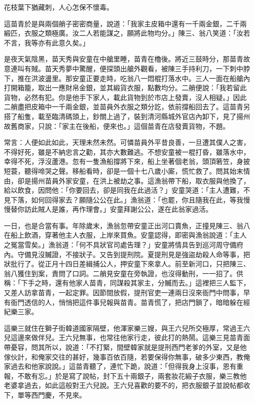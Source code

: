 花枝葉下猶藏刺，人心怎保不懷毒。

這苗青於是與兩個艄子密密商量，說道：「我家主皮箱中還有一千兩金銀，二千兩緞匹，衣服之類極廣。汝二人若能謀之，願將此物均分。」陳三、翁八笑道：「汝若不言，我等亦有此意久矣。」

是夜天氣陰黑，苗天秀與安童在中艙里睡，苗青在櫓後。將近三鼓時分，那苗青故意連叫有賊。苗天秀夢中驚醒，便探頭出艙外觀看，被陳三手持利刀，一下刺中脖下，推在洪波盪里。那安童正要走時，吃翁八一悶棍打落水中。三人一面在船艙內打開箱籠，取出一應財帛金銀，並其緞貨衣服，點數均分。二艄便說：「我若留此貨物，必然有犯。你是他手下家人，載此貨物到於市店上發賣，沒人相疑。」因此二艄盡把皮箱中一千兩金銀，並苗員外衣服之類分訖，依前撐船回去了。這苗青另搭了船隻，載至臨清碼頭上，鈔關上過了，裝到清河縣城外官店內卸下，見了揚州故舊商家，只說：「家主在後船，便來也。」這個苗青在店發賣貨物，不題。

常言：人便如此如此，天理未然未然。可憐苗員外平昔良善，一旦遭其僕人之害，不得好死，雖是不納忠言之勸，其亦大數難逃。不想安童被一棍打昏，雖落水中，幸得不死，浮沒蘆港。忽有一隻漁船撐將下來，船上坐著個老翁，頭頂箬笠，身披短蓑，聽得啼哭之聲。移船看時，卻是一個十七八歲小廝，慌忙救了。問其始末情由，卻是揚州苗員外家安童，在洪上被劫之事。這漁翁帶下船，取衣服與他換了，給以飲食，因問他：「你要回去，卻是同我在此過活？」安童哭道：「主人遭難，不見下落，如何回得家去？願隨公公在此。」漁翁道：「也罷，你且隨我在此，等我慢慢替你訪此賊人是誰，再作理會。」安童拜謝公公，遂在此翁家過活。

一日，也是合當有事。年除歲末，漁翁忽帶安童正出河口賣魚，正撞見陳三、翁八在船上飲酒，穿著他主人衣服，上岸來買魚。安童認得，即密與漁翁說道：「主人之冤當雪矣。」漁翁道：「何不具狀官司處告理？」安童將情具告到巡河周守備府內。守備見沒贓證，不接狀子。又告到提刑院。夏提刑見是強盜劫殺人命等事，把狀批行了。從正月十四日差緝捕公人，押安童下來拿人。前至新河口，只把陳三、翁八獲住到案，責問了口詞。二艄見安童在旁執證，也沒得動刑，一一招了。供稱：「下手之時，還有他家人苗青，同謀殺其家主，分贓而去。」這裡把三人監下，又差人訪拿苗青，一起定罪。因節間放假，提刑官吏一連兩日沒來衙門中問事，早有衙門透信的人，悄悄把這件事兒報與苗青。苗青慌了，把店門鎖了，暗暗躲在經紀樂三家。

這樂三就住在獅子街韓道國家隔壁，他渾家樂三嫂，與王六兒所交極厚，常過王六兒這邊來做伴兒。王六兒無事，也常往他家行走，彼此打的熱鬧。這樂三見苗青面帶憂容，問其所以，說道：「不打緊，間壁韓家就是提刑西門老爹的外室，又是他傢伙計，和俺家交往的甚好，幾事百依百隨，若要保得你無事，破多少東西，教俺家過去和他家說說。」這苗青聽了，連忙下跪，說道：「但得我身上沒事，恩有重報，不敢有忘。」於是寫了說帖，封下五十兩銀子，兩套妝花緞子衣服，樂三教他老婆拿過去，如此這般對王六兒說。王六兒喜歡的要不的，把衣服銀子並說帖都收下，單等西門慶，不見來。


